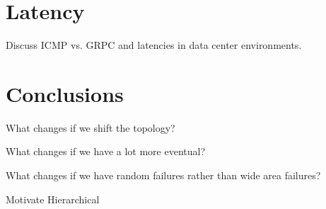 \section{Latency}

Discuss ICMP vs. GRPC and latencies in data center environments.

\section{Conclusions}



What changes if we shift the topology?

What changes if we have a lot more eventual?

What changes if we have random failures rather than wide area failures?

Motivate Hierarchical
